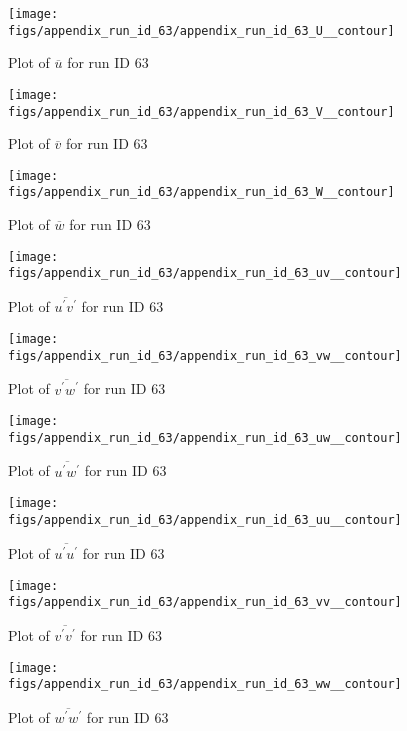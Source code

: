 \begin{figure}[H]
\centering
\texttt{[image: figs/appendix\_run\_id\_63/appendix\_run\_id\_63\_U\_\_contour]}
\caption{Plot of $\overline{u}$ for run ID 63}
\label{fig:appendix_run_id_63_U__contour}
\end{figure}


\begin{figure}[H]
\centering
\texttt{[image: figs/appendix\_run\_id\_63/appendix\_run\_id\_63\_V\_\_contour]}
\caption{Plot of $\overline{v}$ for run ID 63}
\label{fig:appendix_run_id_63_V__contour}
\end{figure}


\begin{figure}[H]
\centering
\texttt{[image: figs/appendix\_run\_id\_63/appendix\_run\_id\_63\_W\_\_contour]}
\caption{Plot of $\overline{w}$ for run ID 63}
\label{fig:appendix_run_id_63_W__contour}
\end{figure}


\begin{figure}[H]
\centering
\texttt{[image: figs/appendix\_run\_id\_63/appendix\_run\_id\_63\_uv\_\_contour]}
\caption{Plot of $\overline{u^\prime v^\prime}$ for run ID 63}
\label{fig:appendix_run_id_63_uv__contour}
\end{figure}


\begin{figure}[H]
\centering
\texttt{[image: figs/appendix\_run\_id\_63/appendix\_run\_id\_63\_vw\_\_contour]}
\caption{Plot of $\overline{v^\prime w^\prime}$ for run ID 63}
\label{fig:appendix_run_id_63_vw__contour}
\end{figure}


\begin{figure}[H]
\centering
\texttt{[image: figs/appendix\_run\_id\_63/appendix\_run\_id\_63\_uw\_\_contour]}
\caption{Plot of $\overline{u^\prime w^\prime}$ for run ID 63}
\label{fig:appendix_run_id_63_uw__contour}
\end{figure}


\begin{figure}[H]
\centering
\texttt{[image: figs/appendix\_run\_id\_63/appendix\_run\_id\_63\_uu\_\_contour]}
\caption{Plot of $\overline{u^\prime u^\prime}$ for run ID 63}
\label{fig:appendix_run_id_63_uu__contour}
\end{figure}


\begin{figure}[H]
\centering
\texttt{[image: figs/appendix\_run\_id\_63/appendix\_run\_id\_63\_vv\_\_contour]}
\caption{Plot of $\overline{v^\prime v^\prime}$ for run ID 63}
\label{fig:appendix_run_id_63_vv__contour}
\end{figure}


\begin{figure}[H]
\centering
\texttt{[image: figs/appendix\_run\_id\_63/appendix\_run\_id\_63\_ww\_\_contour]}
\caption{Plot of $\overline{w^\prime w^\prime}$ for run ID 63}
\label{fig:appendix_run_id_63_ww__contour}
\end{figure}


